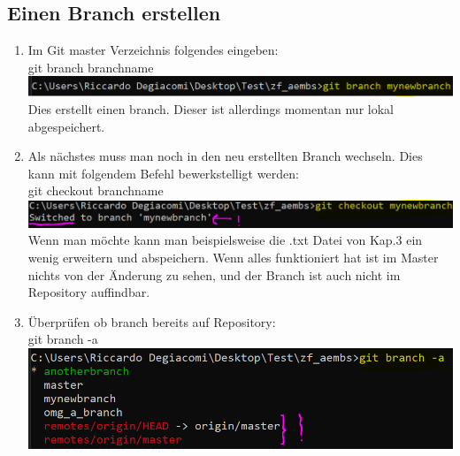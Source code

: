 \documentclass[a4paper, 8pt]{extarticle}
\begin{document}
\begin{multicols*}{3}
            \section{Einen Branch erstellen}    
                 \begin{enumerate}
                    \item   Im Git master Verzeichnis folgendes eingeben:\\
                            git branch branchname\\
                                \includegraphics[width=1\linewidth, left]{img/git_branch_mynewbranch.PNG}\\
                            Dies erstellt einen branch. Dieser ist allerdings momentan nur lokal abgespeichert.
                    \item   Als nächstes muss man noch in den neu erstellten Branch wechseln. Dies kann mit folgendem Befehl
                            bewerkstelligt werden:\\
                            git checkout branchname\\
                                \includegraphics[width=1\linewidth, left]{img/git_checkout_branchname.PNG}\\
                            Wenn man möchte kann man beispielsweise die .txt Datei von Kap.3 ein wenig erweitern 
                            und abspeichern. Wenn alles funktioniert hat ist im Master nichts von der Änderung zu sehen, 
                            und der Branch ist auch nicht im Repository auffindbar. \\ 
                    \item   Überprüfen ob branch bereits auf Repository:\\
                            git branch -a\\
                                \includegraphics[width=1\linewidth, left]{img/git_branch_branch-a.PNG}\\

\end{enumerate}
\end{multicols*}
\end{document}
